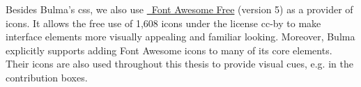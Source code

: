 \documentclass[\relativeRoot/main.tex]{subfiles}
\begin{document}
Besides Bulma's \gls{css}, we also use \href{https://fontawesome.com}{~Font Awesome Free} (version 5) \cite{noauthor_font_2022} as a provider of icons. It allows the free use of 1,608 icons under the license  \gls{cc-by} to make interface elements more visually appealing and familiar looking. Moreover, Bulma explicitly supports adding Font Awesome icons to many of its core elements. Their icons are also used throughout this thesis to provide visual cues, e.g. in the contribution boxes.
\end{document}
